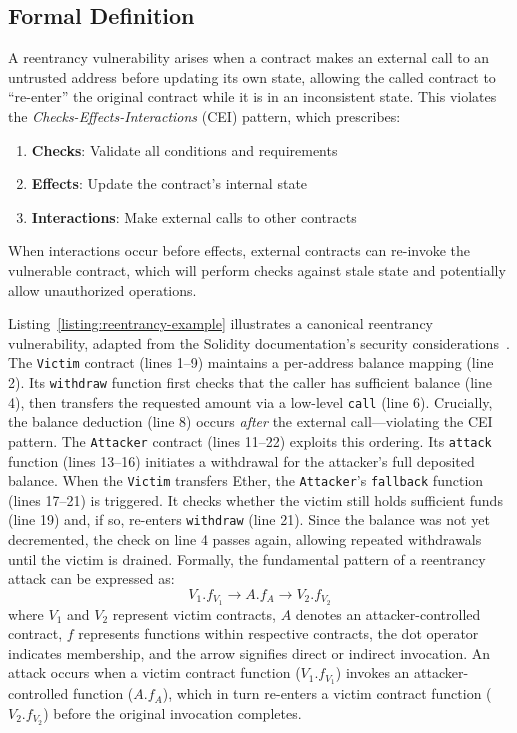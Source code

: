 \subsection{Formal Definition}

A reentrancy vulnerability arises when a contract makes an external call to an untrusted address before updating its own state, allowing the called contract to ``re-enter'' the original contract while it is in an inconsistent state. This violates the \textit{Checks-Effects-Interactions} (CEI) pattern, which prescribes:
\begin{enumerate}
    \item \textbf{Checks}: Validate all conditions and requirements
    \item \textbf{Effects}: Update the contract's internal state
    \item \textbf{Interactions}: Make external calls to other contracts
\end{enumerate}

When interactions occur before effects, external contracts can re-invoke the vulnerable contract, which will perform checks against stale state and potentially allow unauthorized operations.



Listing~\ref{listing:reentrancy-example} illustrates a canonical reentrancy vulnerability, adapted from the Solidity documentation's security considerations~\cite{solidity-security-considerations}. The \lstinline{Victim} contract (lines 1--9) maintains a per-address balance mapping (line 2). Its \lstinline{withdraw} function first checks that the caller has sufficient balance (line 4), then transfers the requested amount via a low-level \lstinline{call} (line 6). Crucially, the balance deduction (line 8) occurs \textit{after} the external call---violating the CEI pattern. The \lstinline{Attacker} contract (lines 11--22) exploits this ordering. Its \lstinline{attack} function (lines 13--16) initiates a withdrawal for the attacker's full deposited balance. When the \lstinline{Victim} transfers Ether, the \lstinline{Attacker}'s \lstinline{fallback} function (lines 17--21) is triggered. It checks whether the victim still holds sufficient funds (line 19) and, if so, re-enters \lstinline{withdraw} (line 21). Since the balance was not yet decremented, the check on line 4 passes again, allowing repeated withdrawals until the victim is drained.
Formally, the fundamental pattern of a reentrancy attack can be expressed as:
\begin{equation}
V_1.f_{V_1} \rightarrow A.f_{A} \rightarrow V_2.f_{V_2}
\label{eq:reentrancy-pattern}
\end{equation}
where $V_1$ and $V_2$ represent victim contracts, $A$ denotes an attacker-controlled contract, $f$ represents functions within respective contracts, the dot operator indicates membership, and the arrow signifies direct or indirect invocation. An attack occurs when a victim contract function ($V_1.f_{V_1}$) invokes an attacker-controlled function ($A.f_A$), which in turn re-enters a victim contract function ($V_2.f_{V_2}$) before the original invocation completes.

